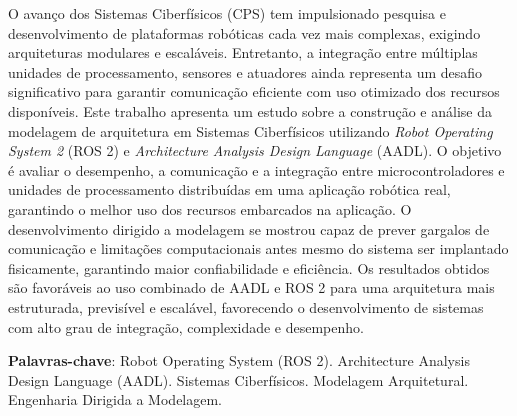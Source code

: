 \begin{resumo}
O avanço dos Sistemas Ciberfísicos (CPS) tem impulsionado pesquisa e desenvolvimento de plataformas robóticas cada vez mais complexas, exigindo arquiteturas modulares e escaláveis. Entretanto, a integração entre múltiplas unidades de processamento, sensores e atuadores ainda representa um desafio significativo para garantir comunicação eficiente com uso otimizado dos recursos disponíveis.
Este trabalho apresenta um estudo sobre a construção e análise da modelagem de arquitetura em Sistemas Ciberfísicos utilizando \textit{Robot Operating System 2} (ROS 2) e \textit{Architecture Analysis Design Language} (AADL). O objetivo é avaliar o desempenho, a comunicação e a integração entre microcontroladores e unidades de processamento distribuídas em uma aplicação robótica real, garantindo o melhor uso dos recursos embarcados na aplicação. 
O desenvolvimento dirigido a modelagem se mostrou capaz de prever gargalos de comunicação e limitações computacionais antes mesmo do sistema ser implantado fisicamente, garantindo maior confiabilidade e eficiência. Os resultados obtidos são favoráveis ao uso combinado de AADL e ROS 2 para uma arquitetura mais estruturada, previsível e escalável, favorecendo o desenvolvimento de sistemas com alto grau de integração, complexidade e desempenho.

\textbf{Palavras-chave}: Robot Operating System (ROS 2). Architecture Analysis Design Language (AADL). Sistemas Ciberfísicos. Modelagem Arquitetural. Engenharia Dirigida a Modelagem.
\end{resumo}